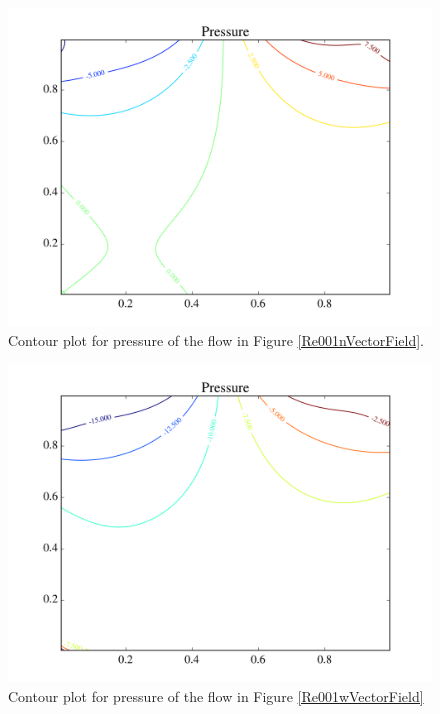 \documentclass[journal]{IEEEtran}
\begin{document}
\begin{figure}[!t]
\centering
\includegraphics[width=\linewidth]{figures/Re001/n/pressure}
\caption{Contour plot for pressure of the flow in Figure \ref{Re001nVectorField}. \label{Re001nPressure}}
\end{figure}

\begin{figure}[!t]
\centering
\includegraphics[width=\linewidth]{figures/Re001/w/pressure}
\caption{Contour plot for pressure of the flow in Figure \ref{Re001wVectorField}\label{Re001wPressure}}
\end{figure}
\end{document}
